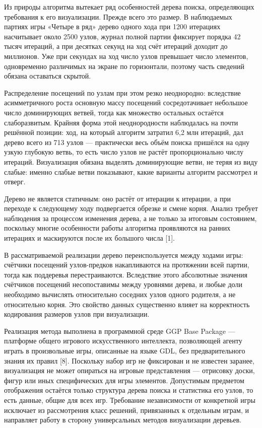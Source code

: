 Из природы алгоритма вытекает ряд особенностей дерева поиска, определяющих требования к его визуализации. Прежде всего это размер. В наблюдаемых партиях игры «Четыре в ряд» дерево одного хода при 1200 итерациях насчитывает около 2500 узлов, журнал полной партии фиксирует порядка 42 тысяч итераций, а при десятках секунд на ход счёт итераций доходит до миллионов. Уже при секундах на ход число узлов превышает число элементов, одновременно различимых на экране по горизонтали, поэтому часть сведений обязана оставаться скрытой.

Распределение посещений по узлам при этом резко неоднородно: вследствие асимметричного роста основную массу посещений сосредотачивает небольшое число доминирующих ветвей, тогда как множество остальных остаётся слаборазвитым. Крайняя форма этой неоднородности наблюдалась на почти решённой позиции: ход, на который алгоритм затратил 6,2 млн итераций, дал дерево всего из 713 узлов — практически весь объём поиска пришёлся на одну узкую глубокую ветвь, то есть число узлов не растёт пропорционально числу итераций. Визуализация обязана выделять доминирующие ветви, не теряя из виду слабые: именно слабые ветви показывают, какие варианты алгоритм рассмотрел и отверг.

Дерево не является статичным: оно растёт от итерации к итерации, а при переходе к следующему ходу подвергается обрезке и смене корня. Анализ требует наблюдения за процессом изменения дерева, а не только за итоговым состоянием, поскольку многие особенности работы алгоритма проявляются на ранних итерациях и маскируются после их большого числа [1].

В рассматриваемой реализации дерево переиспользуется между ходами игры: счётчики посещений узлов-предков накапливаются на протяжении всей партии, тогда как поддеревья перестраиваются. Вследствие этого абсолютные значения счётчиков посещений несопоставимы между уровнями дерева, и любые доли необходимо вычислять относительно соседних узлов одного родителя, а не относительно корня. Это свойство данных существенно влияет на корректность кодирования размеров узлов при визуализации.

Реализация метода выполнена в программной среде GGP Base Package — платформе общего игрового искусственного интеллекта, позволяющей агенту играть в произвольные игры, описанные на языке GDL, без предварительного знания их правил [8]. Поскольку набор игр не фиксирован и не известен заранее, визуализация не может опираться на игровые представления — отрисовку доски, фигур или иных специфических для игры элементов. Допустимым предметом отображения остаётся только структура дерева поиска и статистика его узлов, то есть данные, общие для всех игр. Требование независимости от конкретной игры исключает из рассмотрения класс решений, привязанных к отдельным играм, и направляет работу в сторону универсальных методов визуализации деревьев.

